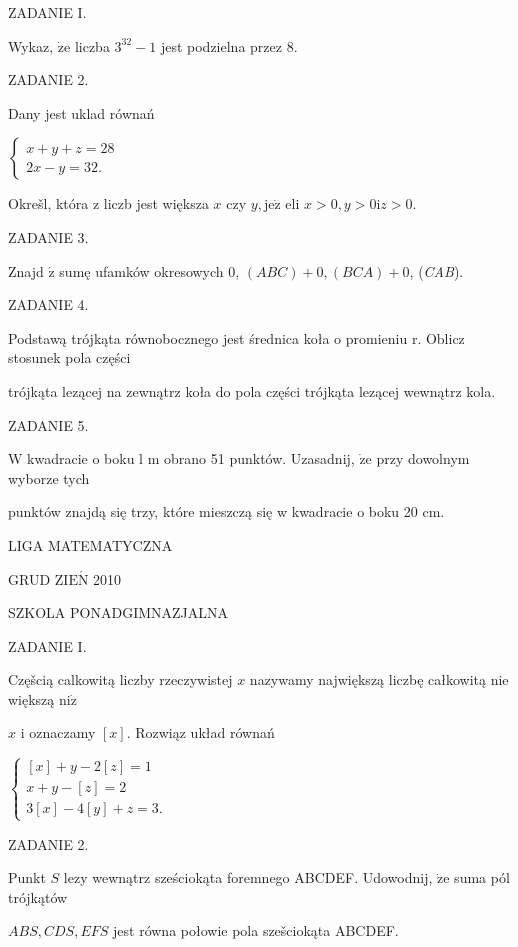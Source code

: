 \documentclass[a4paper,12pt]{article}
\begin{document}
ZADANIE I.

Wykaz, $\dot{\mathrm{z}}\mathrm{e}$ liczba $3^{32}-1$ jest podzielna przez 8.

ZADANIE 2.

Dany jest uklad równań

$\left\{\begin{array}{l}
x+y+z=28\\
2x-y=32.
\end{array}\right.$

Okrešl, która z liczb jest większa $x$ czy $y, \mathrm{j}\mathrm{e}\dot{\mathrm{z}}$ eli $x>0, y>0\mathrm{i}z>0.$

ZADANIE 3.

Znajd $\acute{\mathrm{z}}$ sumę ufamków okresowych 0, $(ABC)+0, (BCA)+0$, ({\it CAB}).

ZADANIE 4.

Podstawą trójkąta równobocznego jest średnica koła o promieniu r. Oblicz stosunek pola części

trójkąta lezącej na zewnątrz koła do pola części trójkąta lezącej wewnątrz kola.

ZADANIE 5.

$\mathrm{W}$ kwadracie o boku l $\mathrm{m}$ obrano 51 punktów. Uzasadnij, $\dot{\mathrm{z}}\mathrm{e}$ przy dowolnym wyborze tych

punktów znajdą się trzy, które mieszczą się w kwadracie o boku 20 cm.






LIGA MATEMATYCZNA

GRUD Z$\mathrm{I}\mathrm{E}\acute{\mathrm{N}}$ 2010

SZKOLA PONADGIMNAZJALNA

ZADANIE I.

Częšcią calkowitą liczby rzeczywistej $x$ nazywamy największą liczbę całkowitą nie większą $\mathrm{n}\mathrm{i}\dot{\mathrm{z}}$

$x$ i oznaczamy $[x]$. Rozwiąz układ równań

$\left\{\begin{array}{l}
[x]+y-2[z]=1\\
x+y-[z]=2\\
3[x]-4[y]+z=3.
\end{array}\right.$

ZADANIE 2.

Punkt $S$ lezy wewnątrz sześciokąta foremnego ABCDEF. Udowodnij, $\dot{\mathrm{z}}\mathrm{e}$ suma pól trójkątów

$ABS, CDS, EFS$ jest równa połowie pola szešciokąta ABCDEF.
\end{document}
